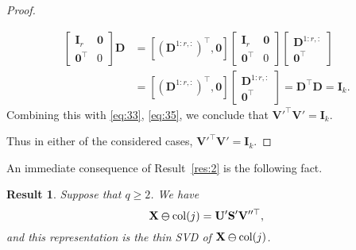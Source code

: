 \documentclass[11pt,a4paper]{article}
\theoremstyle{break}
\numberwithin{dummy}{section}
\theoremstyle{plain}
\newtheorem{result}{Result}[section]
\theoremstyle{plain}
\theoremstyle{plain}
\theoremstyle{plain}
\theoremstyle{plain}
\theoremstyle{MyNonumberplain}
\newtheorem{proof}{Proof}
\newcommand{\0}{\M{0}}
\newcommand{\M}[1]{\mathbf{#1}}
\newcommand{\T}{\top}
\newcommand{\delcol}[2]{\M{#1} \varominus {\mathrm{col}}({#2})}
\begin{document}
\begin{proof}
\begin{enumerate}[font=\upshape,label=(\roman*),wide,align=right]
\begin{align*}
\begin{bmatrix}
        \M{I}_r & \0 \\
        \0^\T & 0
      \end{bmatrix}
               \M{D}
             & =
               [(\M{D}^{1:r, :})^\T, \0]
               \begin{bmatrix}
                 \M{I}_r & \0 \\
                 \0^\T & 0
               \end{bmatrix}
                        \begin{bmatrix}
                          \M{D}^{1:r, :}
                          \\
                          \0^\T
                        \end{bmatrix}
      \\ & =
                [(\M{D}^{1:r, :})^\T, \0]
                \begin{bmatrix}
                  \M{D}^{1:r, :}
                  \\
                  \0^\T
                \end{bmatrix}
    = \M{D}^\T \M{D} = \M{I}_k.
    \end{align*} 
    Combining this with \eqref{eq:33}, \eqref{eq:35}, we conclude that
    \begin{math}
      \M{V}'^\T \M{V}' = \M{I}_k.
    \end{math}
  \end{enumerate}
  Thus in either of the considered cases, 
  \begin{math}
    \M{V}'^\T \M{V}' = \M{I}_k.
  \end{math}
\end{proof}

An immediate consequence of Result~\ref{res:2} is the following fact.

\begin{result}
  \label{res:3}
  Suppose that $q \geq 2$. We have
  \begin{equation}
    \label{eq:37}
    \delcol{X}{j} = \M{U}' \M{S}' \M{V}''^\T,
  \end{equation}
  and this representation is the thin SVD of $\delcol{X}{j}$.
\end{result}
\end{document}
